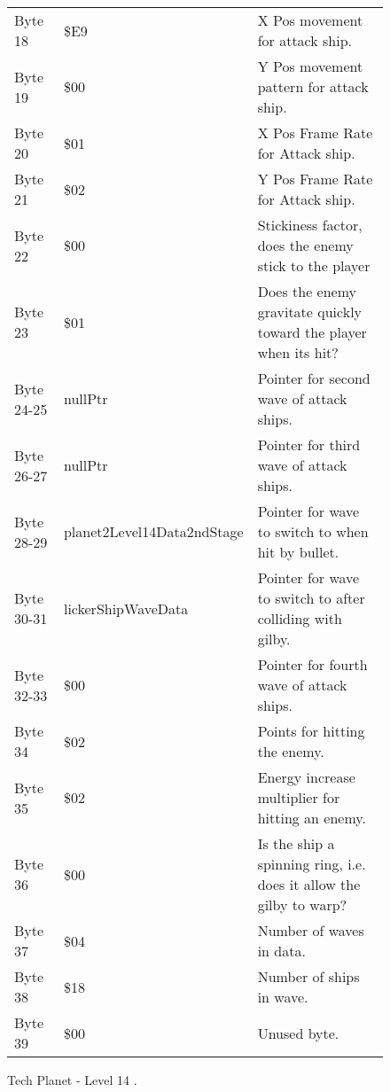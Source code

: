 \begin{figure}[H]
{\begin{adjustbox}{width=12cm}
\begin{tabular}{lll}
 Byte 18    & \$E9                        & X Pos movement for attack ship.                                     \\
 Byte 19    & \$00                        & Y Pos movement pattern for attack ship.                             \\
 Byte 20    & \$01                        & X Pos Frame Rate for Attack ship.                                   \\
 Byte 21    & \$02                        & Y Pos Frame Rate for Attack ship.                                   \\
 Byte 22    & \$00                        & Stickiness factor, does the enemy stick to the player               \\
 Byte 23    & \$01                        & Does the enemy gravitate quickly toward the player when its hit?    \\
 Byte 24-25 & nullPtr                    & Pointer for second wave of attack ships.                            \\
 Byte 26-27 & nullPtr                    & Pointer for third wave of attack ships.                             \\
 Byte 28-29 & planet2Level14Data2ndStage & Pointer for wave to switch to when hit by bullet.                   \\
 Byte 30-31 & lickerShipWaveData         & Pointer for  wave to switch to after colliding with gilby.          \\
 Byte 32-33 & \$00                        & Pointer for fourth wave of attack ships.                            \\
 Byte 34    & \$02                        & Points for hitting the enemy.                                       \\
 Byte 35    & \$02                        & Energy increase multiplier for hitting an enemy.                    \\
 Byte 36    & \$00                        & Is the ship a spinning ring, i.e. does it allow the gilby to warp?  \\
 Byte 37    & \$04                        & Number of waves in data.                                            \\
 Byte 38    & \$18                        & Number of ships in wave.                                            \\
 Byte 39    & \$00                        & Unused byte.                                                        \\
\bottomrule
\end{tabular}

  \end{adjustbox}

  }\caption*{Tech Planet - Level 14
.}
\end{figure}

